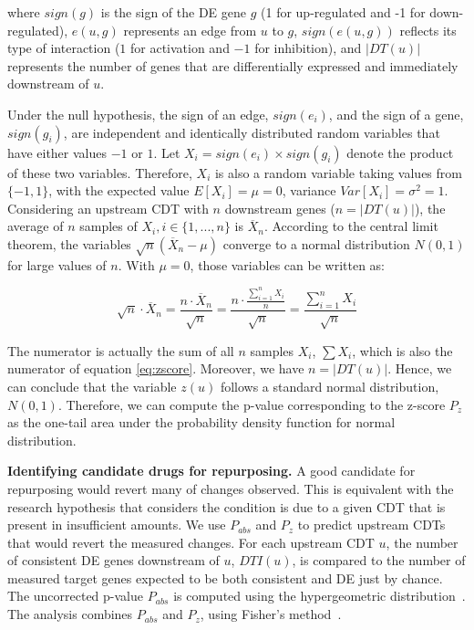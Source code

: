 where $sign(g)$ is the sign of the DE gene $g$ (1 for up-regulated and -1 for down-regulated), $e(u,g)$ represents an edge from $u$ to $g$,  $sign(e(u,g))$ reflects its type of interaction ($1$ for activation and $-1$ for inhibition), and $|DT(u)|$ represents the number of genes that are differentially expressed and immediately downstream of $u$. 


Under the null hypothesis, the sign of an edge, $sign(e_i)$, and the sign of a gene, $sign(g_i)$, are independent and identically distributed random variables that have either values $-1$ or $1$.  Let $X_i = sign(e_i) \times sign(g_i)$ denote the product of these two variables. Therefore, $X_i$ is also a random variable taking values from $\{-1,1\}$, with the expected value $E[X_i] = \mu = 0$, variance $Var[X_i] = \sigma^2 = 1$. Considering an upstream CDT with $n$ downstream genes ($n = |DT(u)|$), the  average of $n$ samples of $X_i, i \in \{1,...,n\}$ is $\overline{X}_n$.  According to the central limit theorem, the variables $\sqrt{n}(\overline{X}_n - \mu)$ converge  to a normal distribution $N(0,1)$ for large values of $n$. With $\mu = 0$, those variables can be written as:

\begin{equation}
\sqrt{n} \cdot \overline{X}_n = \frac{n \cdot \overline{X}_n} {\sqrt{n}} = \frac{n \cdot \frac{\sum_{i=1}^n X_i}{n}}{\sqrt{n}} = \frac{\sum_{i=1}^n X_i}{\sqrt{n}}
\end{equation}

The numerator is actually the sum of all $n$ samples $X_i$, $\sum{X_i}$, which is also the numerator of equation \ref{eq:zscore}. 
Moreover, we have $n = |DT(u)|$.
Hence, we can conclude that the variable $z(u)$ follows a standard normal distribution, $N(0,1)$. Therefore, we can compute the p-value corresponding to the z-score $P_z$ as the one-tail area under the probability density function for normal distribution.

\textbf{Identifying candidate drugs for repurposing.}
A good candidate for repurposing would revert many of changes observed. This is equivalent  with the research hypothesis that considers the condition is due to a given CDT that is present in insufficient amounts.
We use $P_{abs}$ and $P_z$ to predict upstream CDTs that would revert the measured changes. 
For each upstream CDT $u$, the number of consistent DE genes downstream of $u$, $DTI(u)$, is compared to the number of measured target genes expected to be both consistent and DE just by chance. The uncorrected p-value $P_{abs}$ is computed using the hypergeometric distribution~\cite{DraghiciOT:2003, DraghiciBook:2011}. The analysis combines $P_{abs}$ and $P_z$, using  Fisher's method~\cite{fisher1925statistical}. %



